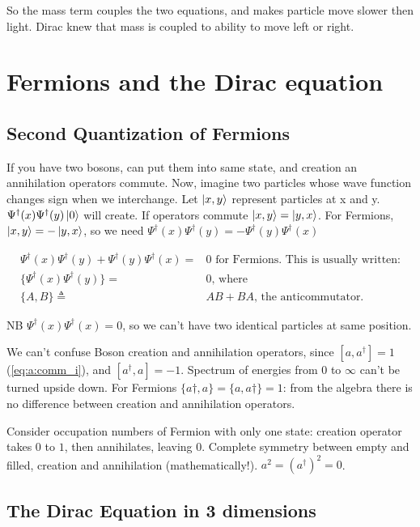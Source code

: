 \documentclass[]{article}
\begin{document}
So the mass term couples the two equations, and makes particle move slower then light. Dirac knew that mass is coupled to ability to move left or right.

\section{Fermions and the Dirac equation}

\subsection{Second Quantization of Fermions}

If you have two bosons, can put them into same state, and creation an annihilation operators commute. Now, imagine two particles whose wave function changes sign when we interchange. Let $\ket{x,y}$ represent particles at x and y. $\Psi^\dagger(x)\Psi^\dagger(y)\ket{0}$ will create. If operators commute $\ket{x,y}=\ket{y,x}$. For Fermions, $\ket{x,y}=-\ket{y,x}$, so we need  $\Psi^\dagger(x)\Psi^\dagger(y)= -\Psi^\dagger(y)\Psi^\dagger(x)$
 
\begin{align*}
\Psi^\dagger(x)\Psi^\dagger(y)+\Psi^\dagger(y)\Psi^\dagger(x)=&0 \text{ for Fermions. This is usually written:}\\
\{\Psi^\dagger(x)\Psi^\dagger(y)\}=&0 \text{, where}\\
\{A,B\}\triangleq& AB + BA \text{, the anticommutator.}
\end{align*}

NB  $\Psi^\dagger(x)\Psi^\dagger(x)=0$,  so we can't have two identical particles at same position.

We can't confuse Boson creation and annihilation operators, since $[a,a^\dagger]=1$ (\ref{eq:a:comm_i}), and $[a^\dagger,a]=-1$. Spectrum of energies from $0$ to $\infty$ can't be turned upside down. For Fermions $\{a\dagger,a\}= \{a,a\dagger\}=1$: from the algebra there is no difference between creation and annihilation operators.

Consider occupation numbers of Fermion with only one state: creation operator takes $0$ to $1$, then annihilates, leaving 0. Complete symmetry between empty and filled, creation and annihilation (mathematically!). $a^2=(a^\dagger)^2=0$.

\subsection{The Dirac Equation in 3 dimensions}
\end{document}
